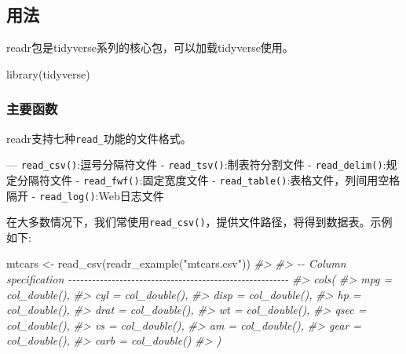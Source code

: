 \documentclass[
]{book}
\newenvironment{Shaded}{\begin{snugshade}}{\end{snugshade}}
\newcommand{\CommentTok}[1]{\textcolor[rgb]{0.56,0.35,0.01}{\textit{#1}}}
\newcommand{\FunctionTok}[1]{\textcolor[rgb]{0.00,0.00,0.00}{#1}}
\newcommand{\NormalTok}[1]{#1}
\newcommand{\OtherTok}[1]{\textcolor[rgb]{0.56,0.35,0.01}{#1}}
\newcommand{\StringTok}[1]{\textcolor[rgb]{0.31,0.60,0.02}{#1}}
\begin{document}
\hypertarget{readr:usage}{%
\subsection{用法}\label{readr:usage}}

readr包是tidyverse系列的核心包，可以加载tidyverse使用。

\begin{Shaded}
\begin{Highlighting}[]
\FunctionTok{library}\NormalTok{(tidyverse)}
\end{Highlighting}
\end{Shaded}

\hypertarget{ux4e3bux8981ux51fdux6570}{%
\subsubsection{主要函数}\label{ux4e3bux8981ux51fdux6570}}

readr支持七种\texttt{read\_}功能的文件格式。

--- \texttt{read\_csv()}:逗号分隔符文件
- \texttt{read\_tsv()}:制表符分割文件
- \texttt{read\_delim()}:规定分隔符文件
- \texttt{read\_fwf()}:固定宽度文件
- \texttt{read\_table()}:表格文件，列间用空格隔开
- \texttt{read\_log()}:Web日志文件

在大多数情况下，我们常使用\texttt{read\_csv()}，提供文件路径，将得到数据表。示例如下:

\begin{Shaded}
\begin{Highlighting}[]
\NormalTok{mtcars }\OtherTok{\textless{}{-}} \FunctionTok{read\_csv}\NormalTok{(}\FunctionTok{readr\_example}\NormalTok{(}\StringTok{"mtcars.csv"}\NormalTok{))}
\CommentTok{\#\textgreater{} }
\CommentTok{\#\textgreater{} {-}{-} Column specification {-}{-}{-}{-}{-}{-}{-}{-}{-}{-}{-}{-}{-}{-}{-}{-}{-}{-}{-}{-}{-}{-}{-}{-}{-}{-}{-}{-}{-}{-}{-}{-}{-}{-}{-}{-}{-}{-}{-}{-}{-}{-}{-}{-}{-}{-}{-}{-}{-}{-}{-}{-}{-}{-}{-}{-}}
\CommentTok{\#\textgreater{} cols(}
\CommentTok{\#\textgreater{}   mpg = col\_double(),}
\CommentTok{\#\textgreater{}   cyl = col\_double(),}
\CommentTok{\#\textgreater{}   disp = col\_double(),}
\CommentTok{\#\textgreater{}   hp = col\_double(),}
\CommentTok{\#\textgreater{}   drat = col\_double(),}
\CommentTok{\#\textgreater{}   wt = col\_double(),}
\CommentTok{\#\textgreater{}   qsec = col\_double(),}
\CommentTok{\#\textgreater{}   vs = col\_double(),}
\CommentTok{\#\textgreater{}   am = col\_double(),}
\CommentTok{\#\textgreater{}   gear = col\_double(),}
\CommentTok{\#\textgreater{}   carb = col\_double()}
\CommentTok{\#\textgreater{} )}
\end{Highlighting}
\end{Shaded}
\end{document}
